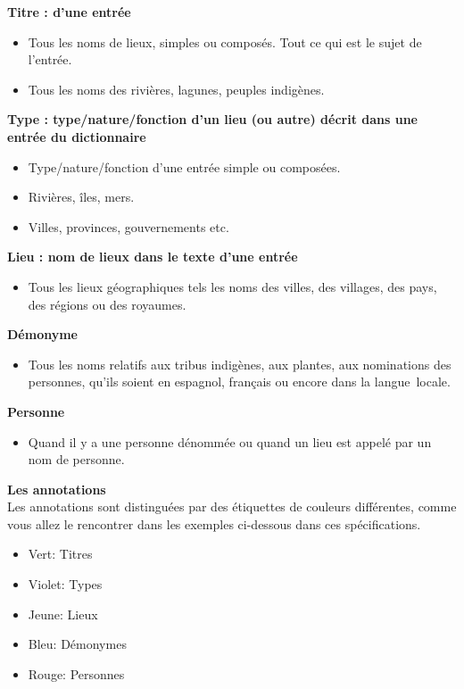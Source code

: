\documentclass[a4paper,12pt,twoside]{book}
\begin{document}
\noindent \textbf{Titre : d’une entrée}\\
\begin{itemize}
\item Tous les noms de lieux, simples ou composés. Tout ce qui est le sujet de l’entrée.
\item Tous les noms des rivières, lagunes, peuples indigènes.\\
 \end{itemize}   
\textbf{Type : type/nature/fonction d’un lieu (ou autre) décrit dans une entrée du dictionnaire}\\
\begin{itemize}

\item Type/nature/fonction d’une entrée simple ou composées.
\item Rivières, îles, mers.
\item Villes, provinces, gouvernements etc.\\
\end{itemize}   
\textbf{Lieu : nom de lieux dans le texte d’une entrée}\\ 
\begin{itemize}
\item Tous les lieux géographiques tels les noms des villes, des villages, des pays, des régions ou des royaumes.\\
\end{itemize}
\textbf{Démonyme}\\
\begin{itemize}
\item Tous les noms relatifs aux tribus indigènes, aux plantes, aux nominations des personnes, qu’ils soient en espagnol, français ou encore dans la langue locale.\\
\end{itemize}
\textbf{Personne}\\
\begin{itemize}
\item Quand il y a une personne dénommée ou quand un lieu est appelé par un nom de personne.\\
\end{itemize}
\textbf{Les annotations}\\

Les annotations sont distinguées par des étiquettes de couleurs différentes, comme vous allez le rencontrer dans les exemples ci-dessous dans ces spécifications.\\
\begin{itemize}
\item Vert: Titres
\item Violet: Types
\item Jeune: Lieux
\item Bleu: Démonymes
\item Rouge: Personnes\\
\end{itemize}
\end{document}
